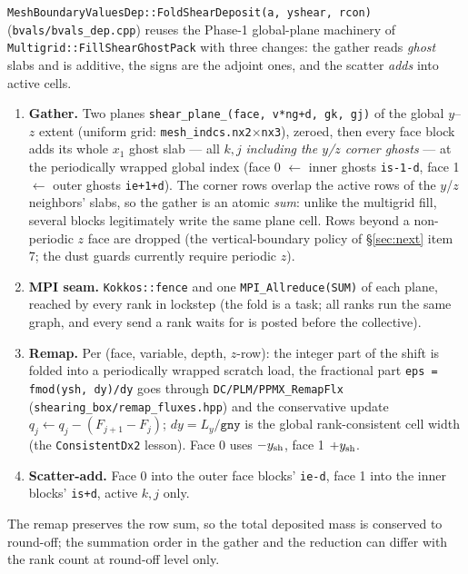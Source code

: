 \documentclass[11pt]{article}
\newcommand{\code}[1]{\texttt{#1}}
\newcommand{\file}[1]{\texttt{\small #1}}
\newcommand{\fn}[1]{\texttt{\small #1}}
\begin{document}
\fn{MeshBoundaryValuesDep::FoldShearDeposit(a, yshear, rcon)} (\file{bvals/bvals\_dep.cpp})
reuses the Phase-1 global-plane machinery of \fn{Multigrid::FillShearGhostPack} with
three changes: the gather reads \emph{ghost} slabs and is additive, the signs are the
adjoint ones, and the scatter \emph{adds} into active cells.
\begin{enumerate}\itemsep2pt
  \item \textbf{Gather.} Two planes \code{shear\_plane\_(face, v*ng+d, gk, gj)} of the
        global $y$--$z$ extent (uniform grid: \code{mesh\_indcs.nx2}$\times$\code{nx3}),
        zeroed, then every face block adds its whole $x_1$ ghost slab --- all $k, j$
        \emph{including the $y$/$z$ corner ghosts} --- at the periodically wrapped
        global index (face 0 $\leftarrow$ inner ghosts \code{is-1-d}, face 1
        $\leftarrow$ outer ghosts \code{ie+1+d}). The corner rows overlap the active
        rows of the $y$/$z$ neighbors' slabs, so the gather is an atomic
        \emph{sum}: unlike the multigrid fill, several blocks legitimately write the same
        plane cell. Rows beyond a non-periodic $z$ face are dropped (the vertical-boundary
        policy of \S\ref{sec:next} item 7; the dust guards currently require periodic $z$).
  \item \textbf{MPI seam.} \code{Kokkos::fence} and one \code{MPI\_Allreduce(SUM)} of each
        plane, reached by every rank in lockstep (the fold is a task; all ranks run the
        same graph, and every send a rank waits for is posted before the collective).
  \item \textbf{Remap.} Per (face, variable, depth, $z$-row): the integer part of the
        shift is folded into a periodically wrapped scratch load, the fractional part
        \code{eps = fmod(ysh, dy)/dy} goes through \fn{DC/PLM/PPMX\_RemapFlx}
        (\file{shearing\_box/remap\_fluxes.hpp}) and the conservative update
        $q_j \leftarrow q_j - (F_{j+1} - F_j)$; $dy = L_y/\code{gny}$ is the global
        rank-consistent cell width (the \fn{ConsistentDx2} lesson). Face 0 uses
        $-y_{\rm sh}$, face 1 $+y_{\rm sh}$.
  \item \textbf{Scatter-add.} Face 0 into the outer face blocks' \code{ie-d}, face 1
        into the inner blocks' \code{is+d}, active $k, j$ only.
\end{enumerate}
The remap preserves the row sum, so the total deposited mass is conserved to
round-off; the summation order in the gather and the reduction can differ with the
rank count at round-off level only.
\end{document}
